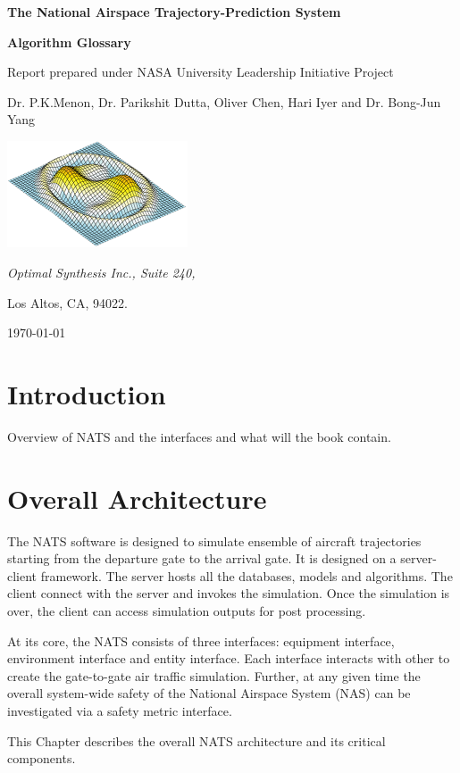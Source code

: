 \documentclass[11pt]{book}              %
\begin{document}
\frontmatter                            %
\begin{titlepage} 
	\centering
	{\huge\bfseries The National Airspace Trajectory-Prediction System\par}
	\vspace{1cm}
	{\huge\bfseries Algorithm Glossary\par}	
	\vspace{3.5cm}
	{Report prepared under NASA University Leadership Initiative Project\par}
	\vfill
	Dr. P.K.Menon, Dr. Parikshit Dutta, Oliver Chen, Hari Iyer and Dr. Bong-Jun Yang\par
	\includegraphics[width=0.4\textwidth]{Pictures/companylogo.png}\par
	{\itshape Optimal Synthesis Inc., Suite 240,\par Los Altos, CA, 94022.\par}
	\vfill
	{\large \today\par}
\end{titlepage}
\tableofcontents                        %
\mainmatter                             %
\chapter{Introduction}                %
Overview of NATS and the interfaces and what will the book contain. 
\chapter{Overall Architecture}
The NATS software is designed to simulate ensemble of aircraft trajectories starting from the departure gate to the arrival gate. It is designed on a server-client framework. The server hosts all the databases, models and algorithms. The client connect with the server and invokes the simulation. Once the simulation is over, the client can access simulation outputs for post processing. \par
At its core, the NATS consists of three interfaces: equipment interface, environment interface and entity interface. Each interface interacts with other to create the gate-to-gate air traffic simulation. Further, at any given time the overall system-wide safety of the National Airspace System (NAS) can be investigated via a safety metric interface. \par
This Chapter describes the overall NATS architecture and its critical components. 
\end{document}
